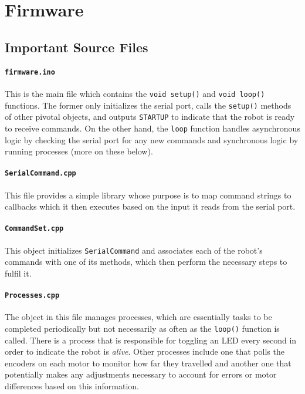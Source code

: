%
%

\section{Firmware}

\subsection{Important Source Files}

\paragraph{\texttt{firmware.ino}}
This is the main file which contains the \texttt{void setup()} and \texttt{void loop()} functions. The former only initializes the serial port, calls the \texttt{setup()} methods of other pivotal objects, and outputs \texttt{STARTUP} to indicate that the robot is ready to receive commands. On the other hand, the \texttt{loop} function handles asynchronous logic by checking the serial port for any new commands and synchronous logic by running processes (more on these below).

\paragraph{\texttt{SerialCommand.cpp}} This file provides a simple library whose purpose is to map command strings to callbacks which it then executes based on the input it reads from the serial port.

\paragraph{\texttt{CommandSet.cpp}} This object initializes \texttt{SerialCommand} and associates each of the robot's commands with one of its methods, which then perform the necessary steps to fulfil it.

\paragraph{\texttt{Processes.cpp}} The object in this file manages processes, which are essentially tasks to be completed periodically but not necessarily as often as the \texttt{loop()} function is called. There is a process that is responsible for toggling an LED every second in order to indicate the robot is \textit{alive}. Other processes include one that polls the encoders on each motor to monitor how far they travelled and another one that potentially makes any adjustments necessary to account for errors or motor differences based on this information.


